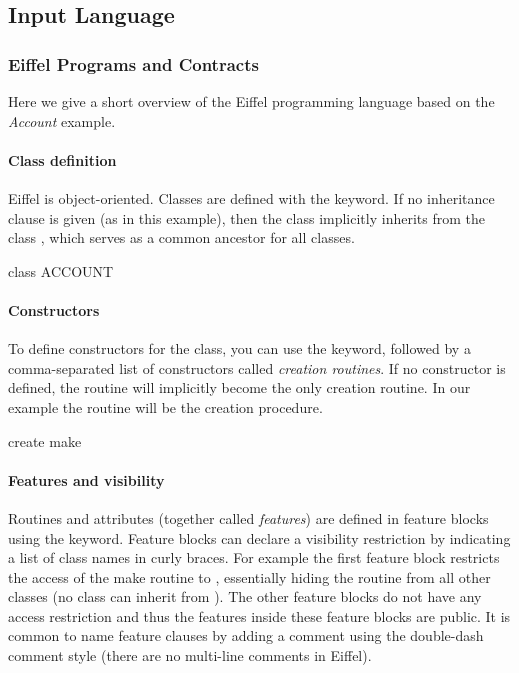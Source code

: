\subsection{Input Language}

\subsubsection*{Eiffel Programs and Contracts}

Here we give a short overview of the Eiffel programming language based on the \emph{Account} example.

\paragraph{Class definition}

Eiffel is object-oriented. Classes are defined with the  keyword. If no inheritance clause is given (as in this example), then the class implicitly inherits from the class , which serves as a common ancestor for all classes.

\begin{erunning}
class
	ACCOUNT
\end{erunning}

\paragraph{Constructors}

To define constructors for the class, you can use the  keyword, followed by a comma-separated list of constructors called \emph{creation routines}. If no constructor is defined, the routine  will implicitly become the only creation routine. In our example the routine  will be the creation procedure.

\begin{erunning}
create
	make
\end{erunning}

\paragraph{Features and visibility}

Routines and attributes (together called \emph{features}) are defined in feature blocks using the  keyword. Feature blocks can declare a visibility restriction by indicating a list of class names in curly braces. For example the first feature block restricts the access of the make routine to , essentially hiding the routine from all other classes (no class can inherit from ). The other feature blocks do not have any access restriction and thus the features inside these feature blocks are public. It is common to name feature clauses by adding a comment using the double-dash \e{--} comment style (there are no multi-line comments in Eiffel).

